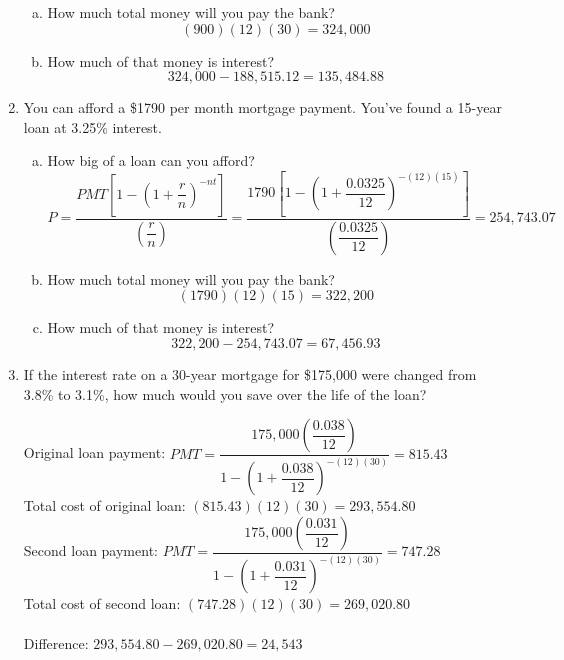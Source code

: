 \begin{enumerate}
\begin{enumerate}[(a)]
\item How much total money will you pay the bank? 
\[(900)(12)(30) = 324,000\]

\item How much of that money is interest? 
\[324,000 - 188,515.12 = 135,484.88\]
\end{enumerate}

\item You can afford a \$1790 per month mortgage payment.  You've found a 15-year loan at 3.25\% interest.
\begin{enumerate}[(a)]
\item How big of a loan can you afford? 
\[P = \dfrac{PMT\left[1-\left(1+\dfrac{r}{n}\right)^{-nt}\right]}{\left(\dfrac{r}{n}\right)} = \dfrac{1790\left[1-\left(1+\dfrac{0.0325}{12}\right)^{-(12)(15)}\right]}{\left(\dfrac{0.0325}{12}\right)} = 254,743.07\]

\item How much total money will you pay the bank? 
\[(1790)(12)(15) = 322,200\]

\item How much of that money is interest? 
\[322,200 - 254,743.07 = 67,456.93\]
\end{enumerate}

\item If the interest rate on a 30-year mortgage for \$175,000 were changed from 3.8\% to 3.1\%, how much would you save over the life of the loan? 
\begin{center}
Original loan payment: $PMT = \dfrac{175,000\left(\dfrac{0.038}{12}\right)}{1-\left(1+\dfrac{0.038}{12}\right)^{-(12)(30)}} = 815.43$\\
Total cost of original loan: $(815.43)(12)(30) = 293,554.80$\\
Second loan payment: $PMT = \dfrac{175,000\left(\dfrac{0.031}{12}\right)}{1-\left(1+\dfrac{0.031}{12}\right)^{-(12)(30)}} = 747.28$\\
Total cost of second loan: $(747.28)(12)(30) = 269,020.80$\\ \text{}\\
Difference: $293,554.80 - 269,020.80 = 24,543$
\end{center}


\end{enumerate}
